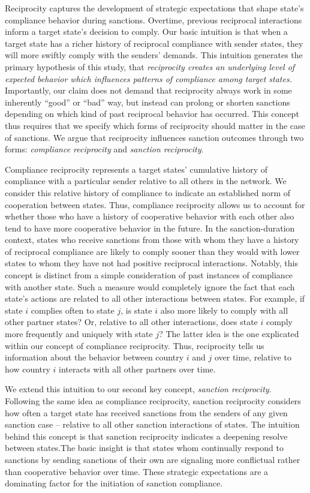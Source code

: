 Reciprocity captures the development of strategic expectations that shape state's compliance behavior during sanctions. Overtime, previous reciprocal interactions inform a target state's decision to comply. Our basic intuition is that when a target state has a richer history of reciprocal compliance with sender states, they will more swiftly comply with the senders' demands. This intuition generates the primary hypothesis of this study, that \textit{reciprocity creates an underlying level of expected behavior which influences patterns of compliance among target states.} Importantly, our claim does not demand that reciprocity always work in some inherently ``good'' or ``bad'' way, but instead can prolong or shorten sanctions depending on which kind of past reciprocal behavior has occurred. This concept thus requires that we specify which forms of reciprocity should matter in the case of sanctions. We argue that reciprocity influences sanction outcomes through two forms: \textit{compliance reciprocity} and \textit{sanction reciprocity}. 

Compliance reciprocity represents a target states' cumulative history of compliance with a particular sender relative to all others in the network. We consider this relative history of compliance to indicate an established norm of cooperation between states. Thus, compliance reciprocity allows us to account for whether those who have a history of cooperative behavior with each other also tend to have more cooperative behavior in the future. In the sanction-duration context, states who receive sanctions from those with whom they have a history of reciprocal compliance are likely to comply sooner than they would with lower states to whom they have not had positive reciprocal interactions. Notably, this concept is distinct from a simple consideration of past instances of compliance with another state. Such a measure would completely ignore the fact that each state's actions are related to all other interactions between states. For example, if state $i$ complies often to state $j$, is state $i$ also more likely to comply with all other partner states? Or, relative to all other interactions, does state $i$ comply more frequently and uniquely with state $j$? The latter idea is the one explicated within our  concept of compliance reciprocity. Thus, reciprocity tells us information about the behavior between country $i$ and $j$ over time, relative to how country $i$ interacts with all other partners over time. 

We extend this intuition to our second key concept, \textit{sanction reciprocity}. Following the same idea as compliance reciprocity, sanction reciprocity considers how often a target state has received sanctions from the senders of any given sanction case -- relative to all other sanction interactions of states. The intuition behind this concept is that sanction reciprocity indicates a deepening resolve between states.The basic insight is that states whom continually respond to sanctions by sending sanctions of their own are signaling more conflictual rather than cooperative behavior over time. These strategic expectations are a dominating factor for the initiation of sanction compliance. 

